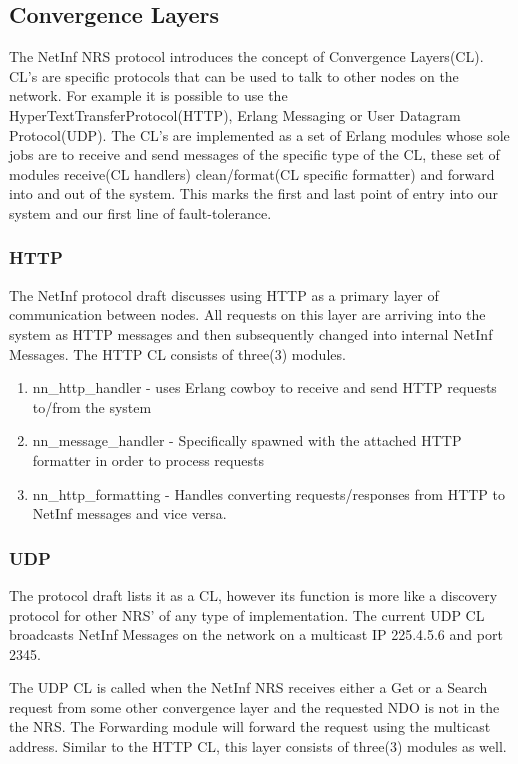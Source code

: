 \subsection {Convergence Layers}
\label{CL}
The NetInf NRS protocol introduces the concept of Convergence Layers(CL). CL's are specific protocols that can be used to talk to other nodes on the network. For example it is possible to use the HyperTextTransferProtocol(HTTP), Erlang Messaging or User Datagram Protocol(UDP). The CL's are implemented as a set of Erlang modules whose sole jobs are to receive and send messages of the specific type of the CL, these set of modules  receive(CL handlers) clean/format(CL specific formatter) and forward into and out of the system. This marks the first and last point of entry into our system and our first line of fault-tolerance. 

\subsubsection{HTTP}

The NetInf protocol draft discusses using HTTP as a primary layer of communication between nodes. All requests on this layer are arriving into the system as HTTP messages and then subsequently changed into internal NetInf Messages. The HTTP CL consists of three(3) modules. 

\begin{enumerate}
\item nn\_http\_handler - uses Erlang cowboy to receive and send HTTP requests to/from the system
\item nn\_message\_handler - Specifically spawned with the attached HTTP formatter in order to process requests
\item nn\_http\_formatting - Handles converting requests/responses from HTTP to NetInf messages and vice versa.
\end{enumerate}


\subsubsection{UDP}

The protocol draft lists it as a CL, however its function is more like a discovery protocol for other NRS' of any type of implementation. The current UDP CL broadcasts NetInf Messages on the network on a multicast IP 225.4.5.6 and port 2345. 

The UDP CL is called when the NetInf NRS receives either a Get or a Search request from some other convergence layer and the requested NDO is not in the the NRS. The Forwarding module will forward the request using the multicast address. Similar to the HTTP CL, this layer consists of three(3) modules as well. 

